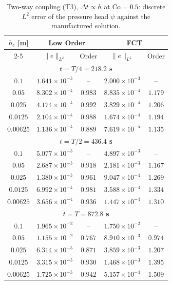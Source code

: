 \begin{table}[t]
\centering
\begin{tabular}{c|cc|cc}
\hline
\multirow{2}{*}{$h_e$ [m]}
& \multicolumn{2}{c|}{\textbf{Low Order}}
& \multicolumn{2}{c}{\textbf{FCT}} \\
\cline{2-5}
& $\|e\|_{L^2}$ & Order
& $\|e\|_{L^2}$ & Order \\
\hline
\hline

\multicolumn{5}{c}{\textbf{$t = T/4 = 218.2$ s}} \\
\hline
$0.1$        & $1.641\times10^{-3}$ & --
           & $2.000\times10^{-3}$ & -- \\
$0.05$       & $8.302\times10^{-4}$ & $0.983$
           & $8.835\times10^{-4}$ & $1.179$ \\
$0.025$      & $4.174\times10^{-4}$ & $0.992$
           & $3.829\times10^{-4}$ & $1.206$ \\
$0.0125$     & $2.104\times10^{-4}$ & $0.988$
           & $1.674\times10^{-4}$ & $1.194$ \\
$0.00625$    & $1.136\times10^{-4}$ & $0.889$
           & $7.619\times10^{-5}$ & $1.135$ \\
\hline\hline

\multicolumn{5}{c}{\textbf{$t = T/2 = 436.4$ s}} \\
\hline
$0.1$        & $5.077\times10^{-3}$ & --
           & $4.897\times10^{-3}$ & -- \\
$0.05$       & $2.687\times10^{-3}$ & $0.918$
           & $2.181\times10^{-3}$ & $1.167$ \\
$0.025$      & $1.380\times10^{-3}$ & $0.961$
           & $9.047\times10^{-4}$ & $1.269$ \\
$0.0125$     & $6.992\times10^{-4}$ & $0.981$
           & $3.588\times10^{-4}$ & $1.334$ \\
$0.00625$    & $3.656\times10^{-4}$ & $0.936$
           & $1.447\times10^{-4}$ & $1.310$ \\
\hline\hline

\multicolumn{5}{c}{\textbf{$t = T = 872.8$ s}} \\
\hline
$0.1$        & $1.965\times10^{-2}$ & --
           & $1.750\times10^{-2}$ & -- \\
$0.05$       & $1.155\times10^{-2}$ & $0.767$
           & $8.910\times10^{-3}$ & $0.974$ \\
$0.025$      & $6.314\times10^{-3}$ & $0.871$
           & $3.859\times10^{-3}$ & $1.207$ \\
$0.0125$     & $3.315\times10^{-3}$ & $0.930$
           & $1.468\times10^{-3}$ & $1.395$ \\
$0.00625$    & $1.725\times10^{-3}$ & $0.942$
           & $5.157\times10^{-4}$ & $1.509$ \\
\hline
\end{tabular}
\caption{Two-way coupling (T3), $\Delta t\propto h$ at $\mathrm{Co}=0.5$: discrete $L^2$ error of the pressure head $\psi$ against the manufactured solution.}
\label{tab:mms_t3_psi}
\end{table}

